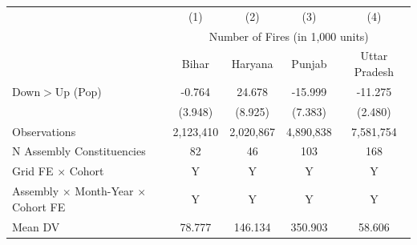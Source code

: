 \begin{tabular}{lcccc} \hline
 & (1) & (2) & (3) & (4) \\
 & \multicolumn{4}{c}{Number of Fires (in 1,000 units)}\\
 & Bihar & Haryana & Punjab & Uttar Pradesh \\ \hline

Down$>$Up (Pop)&      -0.764         &      24.678\sym{***}&     -15.999\sym{**} &     -11.275\sym{***}\\
            &     (3.948)         &     (8.925)         &     (7.383)         &     (2.480)         \\
\hline
Observations&   2,123,410         &   2,020,867         &   4,890,838         &   7,581,754         \\
N Assembly Constituencies&          82         &          46         &         103         &         168         \\
Grid FE  $\times$ Cohort&           Y         &           Y         &           Y         &           Y         \\
Assembly $\times$ Month-Year $\times$ Cohort FE&           Y         &           Y         &           Y         &           Y         \\
Mean DV     &      78.777         &     146.134         &     350.903         &      58.606         \\
\hline
\end{tabular}
